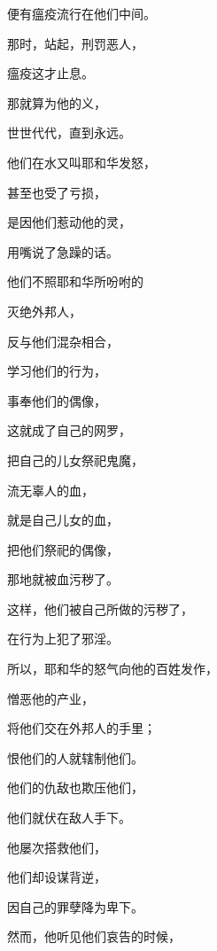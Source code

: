 {\par }{\Q 便有瘟疫流行在他们中间。
\par }{\Q {}那时，{}站起，刑罚恶人，
\par }{\Q 瘟疫这才止息。
\par }{\Q {}那就算为他的义，
\par }{\Q 世世代代，直到永远。
\par }{\BB \par }{\Q {}他们在{}水又叫耶和华发怒，
\par }{\Q 甚至{}也受了亏损，
\par }{\Q {}是因他们惹动他的灵，
\par }{用嘴说了急躁的话。
\par }{\BB \par }{\Q {}他们不照耶和华所吩咐的
\par }{\Q 灭绝外邦人，
\par }{\Q {}反与他们混杂相合，
\par }{\Q 学习他们的行为，
\par }{\Q {}事奉他们的偶像，
\par }{\Q 这就成了自己的网罗，
\par }{\Q {}把自己的儿女祭祀鬼魔，
\par }{\Q {}流无辜人的血，
\par }{\Q 就是自己儿女的血，
\par }{\Q 把他们祭祀{}的偶像，
\par }{\Q 那地就被血污秽了。
\par }{\Q {}这样，他们被自己所做的污秽了，
\par }{\Q 在行为上犯了邪淫。
\par }{\BB \par }{\Q {}所以，耶和华的怒气向他的百姓发作，
\par }{\Q 憎恶他的产业，
\par }{\Q {}将他们交在外邦人的手里；
\par }{\Q 恨他们的人就辖制他们。
\par }{\Q {}他们的仇敌也欺压他们，
\par }{\Q 他们就伏在敌人手下。
\par }{\Q {}他屡次搭救他们，
\par }{\Q 他们却设谋背逆，
\par }{\Q 因自己的罪孽降为卑下。
\par }{\Q {}然而，他听见他们哀告的时候，
}
